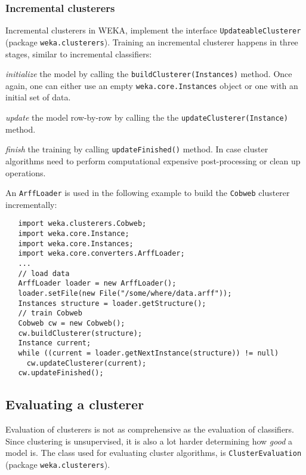 \subsubsection*{Incremental clusterers}
Incremental clusterers in WEKA, implement the interface
\texttt{UpdateableClusterer} (package \texttt{weka.clusterers}). Training an
incremental clusterer happens in three stages, similar to incremental
classifiers:
\begin{tight_enumerate}
	\item \textit{initialize} the model by calling the
\texttt{buildClusterer(Instances)} method. Once again, one can either use an
empty \texttt{weka.core.Instances} object or one with an initial set of data.
	\item \textit{update} the model row-by-row by calling the the
\texttt{updateClusterer(Instance)} method.
	\item \textit{finish} the training by calling
\texttt{updateFinished()} method. In case cluster algorithms need to perform
computational expensive post-processing or clean up operations.
\end{tight_enumerate}

\newpage

An \texttt{ArffLoader} is used in the following example to build the
\texttt{Cobweb} clusterer incrementally:
\begin{verbatim}
   import weka.clusterers.Cobweb;
   import weka.core.Instance;
   import weka.core.Instances;
   import weka.core.converters.ArffLoader;
   ...
   // load data
   ArffLoader loader = new ArffLoader();
   loader.setFile(new File("/some/where/data.arff"));
   Instances structure = loader.getStructure();
   // train Cobweb
   Cobweb cw = new Cobweb();
   cw.buildClusterer(structure);
   Instance current;
   while ((current = loader.getNextInstance(structure)) != null)
     cw.updateClusterer(current);
   cw.updateFinished();
\end{verbatim}

\newpage

\subsection{Evaluating a clusterer}
Evaluation of clusterers is not as comprehensive as the evaluation of
classifiers. Since clustering is unsupervised, it is also a lot harder
determining how \textit{good} a model is. The class used for evaluating cluster
algorithms, is \texttt{ClusterEvaluation} (package \texttt{weka.clusterers}).

